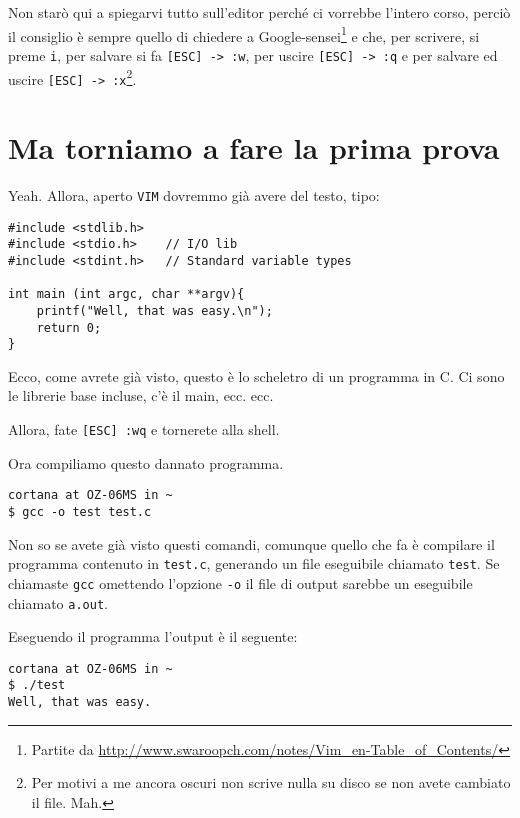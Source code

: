 \documentclass[a4paper]{memoir}
\begin{document}
        Non starò qui a spiegarvi tutto sull'editor perché ci vorrebbe l'intero corso, perciò il consiglio è sempre
        quello di chiedere a Google-sensei\footnote{Partite da \url{http://www.swaroopch.com/notes/Vim_en-Table_of_Contents/}}
        e che, per scrivere, si preme \texttt{i}, per salvare si fa \texttt{[ESC] -> :w}, per uscire \texttt{[ESC] -> :q} 
        e per salvare ed uscire \texttt{[ESC] -> :x}\footnote{Per motivi a me ancora oscuri non scrive nulla su disco
        se non avete cambiato il file. Mah.}.
        
	\section{Ma torniamo a fare la prima prova}
		
		Yeah. Allora, aperto \texttt{VIM} dovremmo già avere del testo, tipo:
		
	    \begin{Verbatim}[label={UNF, DAT syntax highlighting (dentro VIM)}]
#include <stdlib.h>
#include <stdio.h>    // I/O lib
#include <stdint.h>   // Standard variable types

int main (int argc, char **argv){
    printf("Well, that was easy.\n");
    return 0;
}
		\end{Verbatim}
		
		Ecco, come avrete già visto, questo è lo scheletro di un programma in C. Ci sono le librerie base incluse,
		c'è il main, ecc. ecc.
		
		Allora, fate \texttt{[ESC] :wq} e tornerete alla shell.
		
		Ora compiliamo questo dannato programma.
		
		\begin{Verbatim}[label={Compilazione, HO!}]
cortana at OZ-06MS in ~
$ gcc -o test test.c
		\end{Verbatim}
		
		Non so se avete già visto questi comandi, comunque quello che fa è compilare il programma contenuto in \texttt{test.c},
		generando un file eseguibile chiamato \texttt{test}. Se chiamaste \texttt{gcc} omettendo l'opzione \texttt{-o}
		il file di output sarebbe un eseguibile chiamato \texttt{a.out}.
		
		Eseguendo il programma l'output è il seguente:
		
		\begin{Verbatim}[label={Hello, World.}]
cortana at OZ-06MS in ~
$ ./test
Well, that was easy.
		\end{Verbatim}
		
\end{document}
